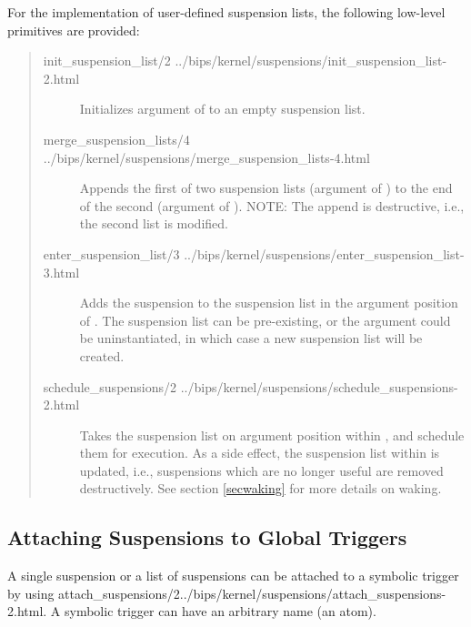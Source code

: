 For the implementation of user-defined suspension lists,
the following low-level primitives are provided:
\begin{quote}
\begin{description}
\item[%
{init_suspension_list/2}%
{../bips/kernel/suspensions/init_suspension_list-2.html}]
    Initializes argument  of  to an empty
    suspension list.
\item[%
{merge_suspension_lists/4}%
{../bips/kernel/suspensions/merge_suspension_lists-4.html}]
    Appends the first of two suspension lists (argument
     of
    ) to
    the end of the second (argument  of ). NOTE: The
    append is destructive, i.e., the second list is modified.
\item[%
{enter_suspension_list/3}%
{../bips/kernel/suspensions/enter_suspension_list-3.html}]
    Adds the suspension  to the suspension list in the
    argument position  of . The suspension list can be
    pre-existing,
    or the argument could be uninstantiated, in which case a new suspension
    list will be created.
\item[%
{schedule_suspensions/2}%
{../bips/kernel/suspensions/schedule_suspensions-2.html}]
    Takes the suspension list on argument position  within
    , and schedule them for execution.
    As a side effect, the suspension list within  is updated,
    i.e., suspensions which are no longer useful are removed destructively.
    See section \ref{secwaking} for more details on waking.
\end{description}
\end{quote}


\subsection{Attaching Suspensions to Global Triggers}
A single suspension or a list of suspensions can be attached to a
symbolic trigger by using
%
{attach_suspensions/2}{../bips/kernel/suspensions/attach_suspensions-2.html}.
A symbolic trigger can have an arbitrary name (an atom).




